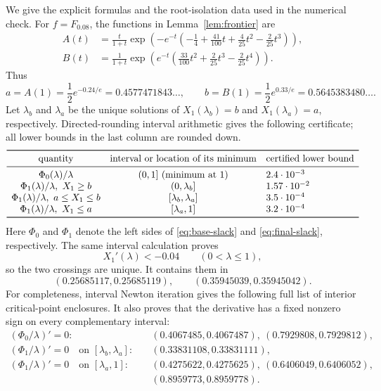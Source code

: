 \documentclass[reqno,final,12pt]{amsart}
\begin{document}
We give the explicit formulas and the root-isolation data
used in the numerical check.
For $f=F_{0.08}$, the functions in Lemma~\ref{lem:frontier} are
\begin{align*}
	A(t)&=\frac{t}{1+t}\exp\!\left(-e^{-t}
	\left(-\frac14+\frac{41}{100}t+\frac4{25}t^2
	-\frac2{25}t^3\right)\right),\\
	B(t)&=\frac1{1+t}\exp\!\left(e^{-t}
	\left(\frac{33}{100}t^2+\frac2{25}t^3
	-\frac2{25}t^4\right)\right).
\end{align*}
Thus
\[
a=A(1)=\frac12e^{-0.24/e}=0.4577471843\ldots,
\qquad
b=B(1)=\frac12e^{0.33/e}=0.5645383480\ldots.
\]
Let $\lambda_b$ and $\lambda_a$ be the unique solutions of
$X_1(\lambda_b)=b$ and $X_1(\lambda_a)=a$, respectively.
Directed-rounding interval arithmetic gives the following certificate;
all lower bounds in the last column are rounded down.
\[
\begin{array}{ccl}
	\toprule
	\text{quantity}&\text{interval or location of its minimum}
	&\text{certified lower bound}\\
	\midrule
	\Phi_0(\lambda)/\lambda&(0,1]\ \text{(minimum at $1$)}
	&2.4\cdot10^{-3}\\
	\Phi_1(\lambda)/\lambda,\ X_1\geq b
	&(0,\lambda_b]&1.57\cdot10^{-2}\\
	\Phi_1(\lambda)/\lambda,\ a\leq X_1\leq b
	&[\lambda_b,\lambda_a]&3.5\cdot10^{-4}\\
	\Phi_1(\lambda)/\lambda,\ X_1\leq a
	&[\lambda_a,1]&3.2\cdot10^{-4}\\
	\bottomrule
\end{array}
\]
Here $\Phi_0$ and $\Phi_1$ denote the left sides of
\eqref{eq:base-slack} and \eqref{eq:final-slack}, respectively.
The same interval calculation proves
\[
X_1'(\lambda)<-0.04
\qquad(0<\lambda\leq1),
\]
so the two crossings are unique.  It contains them in
\[
(0.25685117,0.25685119),\qquad
(0.35945039,0.35945042).
\]
For completeness, interval Newton iteration gives the following full
list of interior critical-point enclosures.  It also proves that the
derivative has a fixed nonzero sign on every complementary interval:
\begin{align*}
	(\Phi_0/\lambda)'=0:
	&\quad(0.4067485,0.4067487),\ (0.7929808,0.7929812),\\
	(\Phi_1/\lambda)'=0\quad\text{on }[\lambda_b,\lambda_a]:
	&\quad(0.33831108,0.33831111),\\
	(\Phi_1/\lambda)'=0\quad\text{on }[\lambda_a,1]:
	&\quad(0.4275622,0.4275625),\ (0.6406049,0.6406052),\\[-1mm]
	&\quad(0.8959773,0.8959778).
\end{align*}
\end{document}
